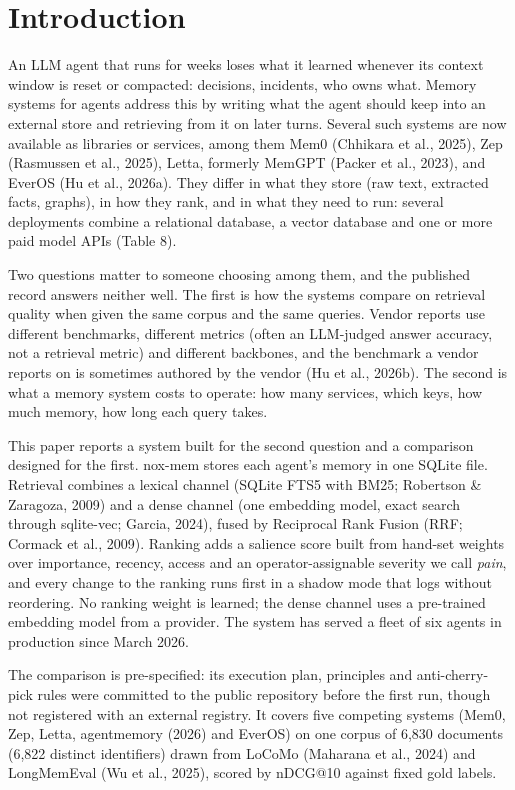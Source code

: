 \documentclass[a4paper,fleqn]{cas-sc}
\begin{document}
\section{Introduction}

An LLM agent that runs for weeks loses what it learned whenever its context window is reset or compacted: decisions, incidents, who owns what. Memory systems for agents address this by writing what the agent should keep into an external store and retrieving from it on later turns. Several such systems are now available as libraries or services, among them Mem0 (Chhikara et al., 2025), Zep (Rasmussen et al., 2025), Letta, formerly MemGPT (Packer et al., 2023), and EverOS (Hu et al., 2026a). They differ in what they store (raw text, extracted facts, graphs), in how they rank, and in what they need to run: several deployments combine a relational database, a vector database and one or more paid model APIs (Table 8).

Two questions matter to someone choosing among them, and the published record answers neither well. The first is how the systems compare on retrieval quality when given the same corpus and the same queries. Vendor reports use different benchmarks, different metrics (often an LLM-judged answer accuracy, not a retrieval metric) and different backbones, and the benchmark a vendor reports on is sometimes authored by the vendor (Hu et al., 2026b). The second is what a memory system costs to operate: how many services, which keys, how much memory, how long each query takes.

This paper reports a system built for the second question and a comparison designed for the first. nox-mem stores each agent's memory in one SQLite file. Retrieval combines a lexical channel (SQLite FTS5 with BM25; Robertson \& Zaragoza, 2009) and a dense channel (one embedding model, exact search through sqlite-vec; Garcia, 2024), fused by Reciprocal Rank Fusion (RRF; Cormack et al., 2009). Ranking adds a salience score built from hand-set weights over importance, recency, access and an operator-assignable severity we call \emph{pain}, and every change to the ranking runs first in a shadow mode that logs without reordering. No ranking weight is learned; the dense channel uses a pre-trained embedding model from a provider. The system has served a fleet of six agents in production since March 2026.

The comparison is pre-specified: its execution plan, principles and anti-cherry-pick rules were committed to the public repository before the first run, though not registered with an external registry. It covers five competing systems (Mem0, Zep, Letta, agentmemory (2026) and EverOS) on one corpus of 6,830 documents (6,822 distinct identifiers) drawn from LoCoMo (Maharana et al., 2024) and LongMemEval (Wu et al., 2025), scored by nDCG@10 against fixed gold labels.
\end{document}

